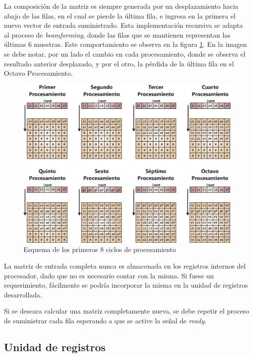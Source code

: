 La composición de la matriz es siempre generada por un desplazamiento hacia abajo de las filas, en el cual se pierde la última fila, e ingresa en la primera el nuevo vector de entrada suministrado. Esta implementación recursiva se adapta al proceso de \textit{beamforming}, donde las filas que se mantienen representan las últimas 6 muestras. Este comportamiento se observa en la figura \ref{fig:hardware_cycles}. En la imagen se debe notar, por un lado el cambio en cada procesamiento, donde se observa el resultado anterior desplazado, y por el otro, la pérdida de la última fila en el Octavo Procesamiento.

\begin{figure}[!h]
 	\begin{center}
 		\includegraphics[width=13 cm]{./figures/C04-hardware_cycles}
 		\caption{Esquema de los primeros 8 ciclos de procesamiento}
		\label{fig:hardware_cycles}
 	\end{center}
\end{figure}

La matriz de entrada completa nunca es almacenada en los registros internos del procesador, dado que no es necesario contar con la misma. Si fuese un requerimiento, fácilmente se podría incorporar la misma en la unidad de registros desarrollada.

Si se deseara calcular una matriz completamente nueva, se debe repetir el proceso de suministrar cada fila esperando a que se active la señal de \textit{ready}.

\newpage

\subsection{Unidad de registros}

